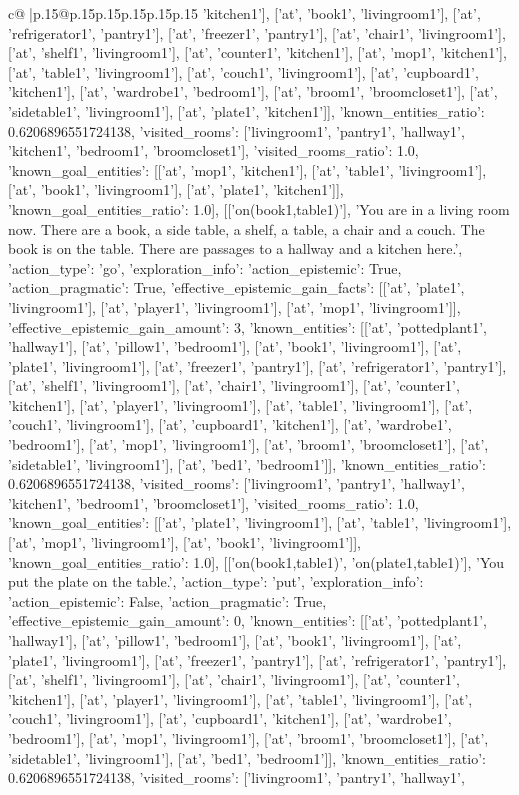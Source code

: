 \documentclass{article}
\begin{document}
{\begin{supertabular}{c@{$\;$}|p{.15\linewidth}@{}p{.15\linewidth}p{.15\linewidth}p{.15\linewidth}p{.15\linewidth}p{.15\linewidth}}
{{{'kitchen1'], ['at', 'book1', 'livingroom1'], ['at', 'refrigerator1', 'pantry1'], ['at', 'freezer1', 'pantry1'], ['at', 'chair1', 'livingroom1'], ['at', 'shelf1', 'livingroom1'], ['at', 'counter1', 'kitchen1'], ['at', 'mop1', 'kitchen1'], ['at', 'table1', 'livingroom1'], ['at', 'couch1', 'livingroom1'], ['at', 'cupboard1', 'kitchen1'], ['at', 'wardrobe1', 'bedroom1'], ['at', 'broom1', 'broomcloset1'], ['at', 'sidetable1', 'livingroom1'], ['at', 'plate1', 'kitchen1']], 'known_entities_ratio': 0.6206896551724138, 'visited_rooms': ['livingroom1', 'pantry1', 'hallway1', 'kitchen1', 'bedroom1', 'broomcloset1'], 'visited_rooms_ratio': 1.0, 'known_goal_entities': [['at', 'mop1', 'kitchen1'], ['at', 'table1', 'livingroom1'], ['at', 'book1', 'livingroom1'], ['at', 'plate1', 'kitchen1']], 'known_goal_entities_ratio': 1.0}}], [['on(book1,table1)'], 'You are in a living room now. There are a book, a side table, a shelf, a table, a chair and a couch. The book is on the table. There are passages to a hallway and a kitchen here.', {'action_type': 'go', 'exploration_info': {'action_epistemic': True, 'action_pragmatic': True, 'effective_epistemic_gain_facts': [['at', 'plate1', 'livingroom1'], ['at', 'player1', 'livingroom1'], ['at', 'mop1', 'livingroom1']], 'effective_epistemic_gain_amount': 3, 'known_entities': [['at', 'pottedplant1', 'hallway1'], ['at', 'pillow1', 'bedroom1'], ['at', 'book1', 'livingroom1'], ['at', 'plate1', 'livingroom1'], ['at', 'freezer1', 'pantry1'], ['at', 'refrigerator1', 'pantry1'], ['at', 'shelf1', 'livingroom1'], ['at', 'chair1', 'livingroom1'], ['at', 'counter1', 'kitchen1'], ['at', 'player1', 'livingroom1'], ['at', 'table1', 'livingroom1'], ['at', 'couch1', 'livingroom1'], ['at', 'cupboard1', 'kitchen1'], ['at', 'wardrobe1', 'bedroom1'], ['at', 'mop1', 'livingroom1'], ['at', 'broom1', 'broomcloset1'], ['at', 'sidetable1', 'livingroom1'], ['at', 'bed1', 'bedroom1']], 'known_entities_ratio': 0.6206896551724138, 'visited_rooms': ['livingroom1', 'pantry1', 'hallway1', 'kitchen1', 'bedroom1', 'broomcloset1'], 'visited_rooms_ratio': 1.0, 'known_goal_entities': [['at', 'plate1', 'livingroom1'], ['at', 'table1', 'livingroom1'], ['at', 'mop1', 'livingroom1'], ['at', 'book1', 'livingroom1']], 'known_goal_entities_ratio': 1.0}}], [['on(book1,table1)', 'on(plate1,table1)'], 'You put the plate on the table.', {'action_type': 'put', 'exploration_info': {'action_epistemic': False, 'action_pragmatic': True, 'effective_epistemic_gain_amount': 0, 'known_entities': [['at', 'pottedplant1', 'hallway1'], ['at', 'pillow1', 'bedroom1'], ['at', 'book1', 'livingroom1'], ['at', 'plate1', 'livingroom1'], ['at', 'freezer1', 'pantry1'], ['at', 'refrigerator1', 'pantry1'], ['at', 'shelf1', 'livingroom1'], ['at', 'chair1', 'livingroom1'], ['at', 'counter1', 'kitchen1'], ['at', 'player1', 'livingroom1'], ['at', 'table1', 'livingroom1'], ['at', 'couch1', 'livingroom1'], ['at', 'cupboard1', 'kitchen1'], ['at', 'wardrobe1', 'bedroom1'], ['at', 'mop1', 'livingroom1'], ['at', 'broom1', 'broomcloset1'], ['at', 'sidetable1', 'livingroom1'], ['at', 'bed1', 'bedroom1']], 'known_entities_ratio': 0.6206896551724138, 'visited_rooms': ['livingroom1', 'pantry1', 'hallway1', }}}
\end{supertabular}}
\end{document}
